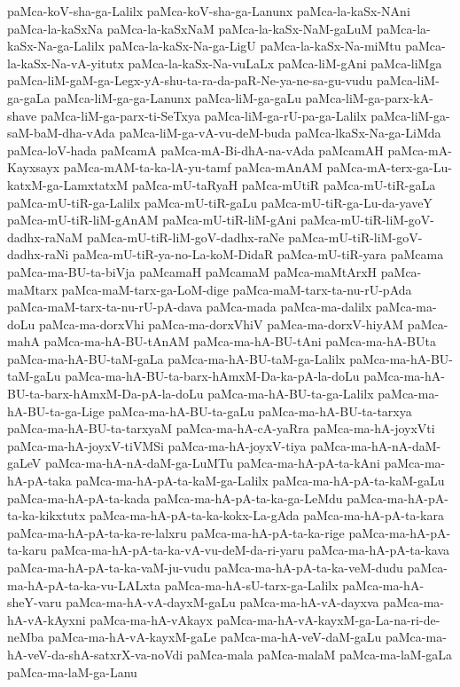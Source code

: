 {paMca-koV-sha-ga-Lalilx
paMca-koV-sha-ga-Lanunx
paMca-la-kaSx-NAni
paMca-la-kaSxNa
paMca-la-kaSxNaM
paMca-la-kaSx-NaM-gaLuM
paMca-la-kaSx-Na-ga-Lalilx
paMca-la-kaSx-Na-ga-LigU
paMca-la-kaSx-Na-miMtu
paMca-la-kaSx-Na-vA-yitutx
paMca-la-kaSx-Na-vuLaLx
paMca-liM-gAni
paMca-liMga
paMca-liM-gaM-ga-Legx-yA-shu-ta-ra-da-paR-Ne-ya-ne-sa-gu-vudu
paMca-liM-ga-gaLa
paMca-liM-ga-ga-Lanunx
paMca-liM-ga-gaLu
paMca-liM-ga-parx-kA-shave
paMca-liM-ga-parx-ti-SeTxya
paMca-liM-ga-rU-pa-ga-Lalilx
paMca-liM-ga-saM-baM-dha-vAda
paMca-liM-ga-vA-vu-deM-buda
paMca-lkaSx-Na-ga-LiMda
paMca-loV-hada
paMcamA
paMca-mA-Bi-dhA-na-vAda
paMcamAH
paMca-mA-Kayxsayx
paMca-mAM-ta-ka-lA-yu-tamf
paMca-mAnAM
paMca-mA-terx-ga-Lu-katxM-ga-LamxtatxM
paMca-mU-taRyaH
paMca-mUtiR
paMca-mU-tiR-gaLa
paMca-mU-tiR-ga-Lalilx
paMca-mU-tiR-gaLu
paMca-mU-tiR-ga-Lu-da-yaveY
paMca-mU-tiR-liM-gAnAM
paMca-mU-tiR-liM-gAni
paMca-mU-tiR-liM-goV-dadhx-raNaM
paMca-mU-tiR-liM-goV-dadhx-raNe
paMca-mU-tiR-liM-goV-dadhx-raNi
paMca-mU-tiR-ya-no-La-koM-DidaR
paMca-mU-tiR-yara
paMcama
paMca-ma-BU-ta-biVja
paMcamaH
paMcamaM
paMca-maMtArxH
paMca-maMtarx
paMca-maM-tarx-ga-LoM-dige
paMca-maM-tarx-ta-nu-rU-pAda
paMca-maM-tarx-ta-nu-rU-pA-dava
paMca-mada
paMca-ma-dalilx
paMca-ma-doLu
paMca-ma-dorxVhi
paMca-ma-dorxVhiV
paMca-ma-dorxV-hiyAM
paMca-mahA
paMca-ma-hA-BU-tAnAM
paMca-ma-hA-BU-tAni
paMca-ma-hA-BUta
paMca-ma-hA-BU-taM-gaLa
paMca-ma-hA-BU-taM-ga-Lalilx
paMca-ma-hA-BU-taM-gaLu
paMca-ma-hA-BU-ta-barx-hAmxM-Da-ka-pA-la-doLu
paMca-ma-hA-BU-ta-barx-hAmxM-Da-pA-la-doLu
paMca-ma-hA-BU-ta-ga-Lalilx
paMca-ma-hA-BU-ta-ga-Lige
paMca-ma-hA-BU-ta-gaLu
paMca-ma-hA-BU-ta-tarxya
paMca-ma-hA-BU-ta-tarxyaM
paMca-ma-hA-cA-yaRra
paMca-ma-hA-joyxVti
paMca-ma-hA-joyxV-tiVMSi
paMca-ma-hA-joyxV-tiya
paMca-ma-hA-nA-daM-gaLeV
paMca-ma-hA-nA-daM-ga-LuMTu
paMca-ma-hA-pA-ta-kAni
paMca-ma-hA-pA-taka
paMca-ma-hA-pA-ta-kaM-ga-Lalilx
paMca-ma-hA-pA-ta-kaM-gaLu
paMca-ma-hA-pA-ta-kada
paMca-ma-hA-pA-ta-ka-ga-LeMdu
paMca-ma-hA-pA-ta-ka-kikxtutx
paMca-ma-hA-pA-ta-ka-kokx-La-gAda
paMca-ma-hA-pA-ta-kara
paMca-ma-hA-pA-ta-ka-re-lalxru
paMca-ma-hA-pA-ta-ka-rige
paMca-ma-hA-pA-ta-karu
paMca-ma-hA-pA-ta-ka-vA-vu-deM-da-ri-yaru
paMca-ma-hA-pA-ta-kava
paMca-ma-hA-pA-ta-ka-vaM-ju-vudu
paMca-ma-hA-pA-ta-ka-veM-dudu
paMca-ma-hA-pA-ta-ka-vu-LALxta
paMca-ma-hA-sU-tarx-ga-Lalilx
paMca-ma-hA-sheY-varu
paMca-ma-hA-vA-dayxM-gaLu
paMca-ma-hA-vA-dayxva
paMca-ma-hA-vA-kAyxni
paMca-ma-hA-vAkayx
paMca-ma-hA-vA-kayxM-ga-La-na-ri-de-neMba
paMca-ma-hA-vA-kayxM-gaLe
paMca-ma-hA-veV-daM-gaLu
paMca-ma-hA-veV-da-shA-satxrX-va-noVdi
paMca-mala
paMca-malaM
paMca-ma-laM-gaLa
paMca-ma-laM-ga-Lanu
}
